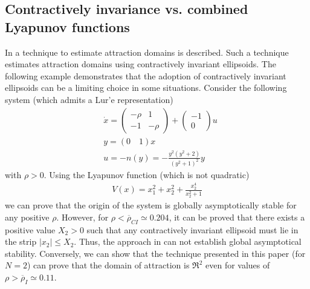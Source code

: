 \documentclass[letterpaper,10pt,twocolumn,journal,final]{IEEEtran}
\begin{document}
\subsection{Contractively invariance vs. combined Lyapunov functions}
In \cite{HuxHua04} a technique to estimate attraction domains is described. Such a technique estimates attraction domains using contractively invariant ellipsoids. The following example demonstrates that the adoption of contractively invariant ellipsoids can be a limiting choice in some situations.
Consider the following system (which admits a Lur'e representation)
\begin{align}
	&\dot x =\left(\begin{array}{cc}
		-\rho & 1\\ -1 & -\rho
		\end{array}\right)+
		\left(\begin{array}{c}
		-1\\ 0 
		\end{array}\right)u\\
	& y = (0 \quad 1)x\\
	& u = -n(y)=-\frac{y^2(y^2+2)}{(y^2+1)^2}y
\end{align}
with $\rho>0$.
Using the Lyapunov function (which is not quadratic)
\begin{align}
	V(x)=x_1^2+x_2^2+\frac{x_2^4}{x_2^2+1}
\end{align}
we can prove that the origin of the system is globally asymptotically stable for any positive $\rho$.
However, for $\rho<\overline \rho_{CI} \simeq 0.204$, it can be proved that there exists a positive value $X_2>0$ such that any contractively invariant ellipsoid must lie in the strip $|x_2|\leq X_2$. Thus, the approach in \cite{HuxHua04} can not establish global asymptotical stability. Conversely, we can show that the technique presented in this paper (for $N=2$) can prove that the domain of attraction is $\Re^2$ even for values of $\rho > \overline \rho_{I}\simeq 0.11$.
\end{document}
